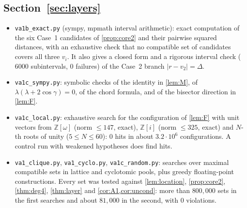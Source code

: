 \documentclass[11pt]{amsart}
\theoremstyle{definition}
\theoremstyle{remark}
\begin{document}
\subsection*{\texorpdfstring{Section~\ref{sec:layers}}{Layer bound}}
\begin{itemize}[leftmargin=2em]
\item \texttt{va1b\_exact.py} (sympy, mpmath interval arithmetic): exact computation of the six Case~1 candidates of \cref{prop:core2} and their pairwise squared distances, with an exhaustive check that no compatible set of candidates covers all three $v_i$. It also gives a closed form and a rigorous interval check ($6000$ subintervals, $0$ failures) of the Case~2 branch $|r-v_2|=\Delta$.
\item \texttt{va1c\_sympy.py}: symbolic checks of the identity in \cref{lem:M}, of $\lambda(\lambda+2\cos\gamma)=0$, of the chord formula, and of the bisector direction in \cref{lem:F}.
\item \texttt{va1c\_local.py}: exhaustive search for the configuration of \cref{lem:F} with unit vectors from $\mathbb Z[\omega]$ (norm $\le147$, exact), $\mathbb Z[i]$ (norm $\le325$, exact) and $N$-th roots of unity ($5\le N\le60$): $0$ hits in about $3.2\cdot10^6$ configurations. A control run with weakened hypotheses does find hits.
\item \texttt{va1\_clique.py}, \texttt{va1\_cyclo.py}, \texttt{va1c\_random.py}: searches over maximal compatible sets in lattice and cyclotomic pools, plus greedy floating-point constructions. Every set was tested against \cref{lem:location}, \cref{prop:core2}, \cref{thm:deg4}, \cref{thm:layer} and \cref{cor:A1,cor:uncond}: more than $800{,}000$ sets in the first searches and about $81{,}000$ in the second, with $0$ violations.
\end{itemize}
\end{document}
